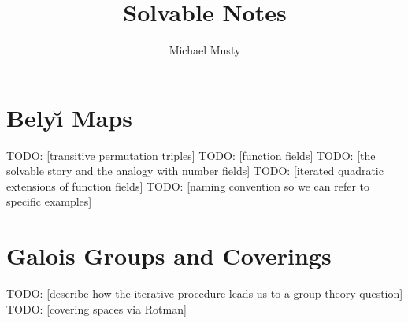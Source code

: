 \documentclass[oneside, reqno, 12pt]{amsart}
\title{Solvable Notes}
\author{Michael Musty}
\theoremstyle{definition}
\theoremstyle{remark}
\newcommand{\todo}[1]{{\color{red} \sf TODO: [#1]}}
\newcommand{\Belyi}{Bely\u{\i} }
\begin{document}
\maketitle
\tableofcontents
\section{\Belyi Maps}{
  \todo{transitive permutation triples}
  \todo{function fields}
  \todo{the solvable story and the analogy with number fields}
  \todo{iterated quadratic extensions of function fields}
  \todo{naming convention so we can refer to specific examples}
}
\section{Galois Groups and Coverings}{
  \todo{describe how the iterative procedure leads us to a group theory question}
  \todo{covering spaces via Rotman}
}
\end{document}
